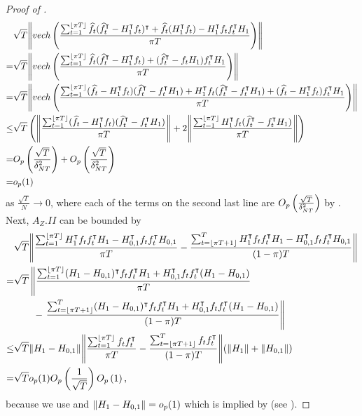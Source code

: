 \documentclass[12pt]{article}
\newcommand*{\tran}{\intercal}
\theoremstyle{plain}
\numberwithin{equation}{section}
\begin{document}
\begin{proof}[Proof of ]
\begin{align*}
&\sqrt{T}\norm{
vech \left( 
\frac{\sumTfloor 
\widehat{f}_t (\widehat{f}_t^\tran - H_1^\tran f_t)^\tran + 
\widehat{f}_t (H_1^\tran f_t) - H_1^\tran f_t f_t^\tran H_1
}
{\pi T}
\right)
} \\
= &\sqrt{T}\norm{
vech \left( 
\frac{\sumTfloor 
\widehat{f}_t (\widehat{f}_t^\tran - H_1^\tran f_t) + 
(\widehat{f}_t^\tran - f_tH_1) f_t^{\tran} H_{1}}{\pi T}
\right)} \\
= &\sqrt{T}\norm{
vech \left( 
\frac{\sumTfloor 
(\widehat{f}_t - H_1^\tran f_t) 
(\widehat{f}_t^\tran - f_t^\tran H_1) + 
H_1^\tran f_t (\widehat{f}_t^\tran - f_t^\tran H_1) + 
(\widehat{f}_t - H_{1}^\tran f_t) f_t^{\tran} H_1}{\pi T}
\right)} \\
\leq
&\sqrt{T} \left( \norm{
\frac{\sumTfloor (\widehat{f}_t - H_1^\tran f_t) 
(\widehat{f}_t^\tran - f_t^\tran H_1)}{\pi T}
} + 
2 \norm{\frac{\sumTfloor H_1^\tran f_t (\widehat{f}_t^\tran - f_t^\tran H_1)}{\pi T}}
\right) \\
= &\OprtTdeltasq + \OprtTdeltasq \\
= &o_p(1)
\end{align*}
as $\frac{\sqrt{T}}{N} \to 0$, where each of the terms on the second last line are $O_p\left( \frac{\sqrt{T}}{\delta_{NT}^2}\right)$ by . Next, $A_Z.II$ can be bounded by
\begin{align*}
&\sqrt{T} \norm{
\frac{\sumTfloor H_1^\tran f_t f_t^{\tran } H_1 - H_{0, 1}^\tran f_t f_t^{ \tran } H_{0, 1}}{\pi T} - 
\frac{\sumTfloort H_1^\tran f_t f_t^{\tran } H_1 - H_{0, 1}^\tran f_t f_t^{ \tran } H_{0, 1}}{(1 - \pi) T}
} \\
= &\sqrt{T} \left\lVert  
\frac{\sumTfloor (H_1 - H_{0, 1})^\tran f_t f_t^{\tran } H_1 + H_{0, 1}^\tran f_t f_t^{\tran } (H_1 - H_{0, 1})}{\pi T} \right. \\
&\quad \quad - \left. \frac{\sumTfloort (H_1 - H_{0, 1})^\tran f_t f_t^{\tran } H_1 + H_{0, 1}^\tran f_t f_t^{\tran } (H_1 - H_{0, 1})}{(1 - \pi) T} 
 \right\rVert \\
\leq &\sqrt{T} \norm{H_1 - H_{0, 1}} 
\norm{
	\frac{\sumTfloor f_t f_t^{\tran }}{\pi T} - \frac{\sumTfloort f_t f_t^{ \tran }}{(1 - \pi) T}
} 
(\norm{H_1} + \norm{H_{0, 1}}) \\
= &\sqrt{T} o_p(1) \OprtT \Op{1},
\end{align*}
because we use  and $\norm{H_1 - H_{0, 1}} = o_p(1)$ which is implied by  (see \textcite{bai_inferential_2003}).
\end{proof}
\end{document}
